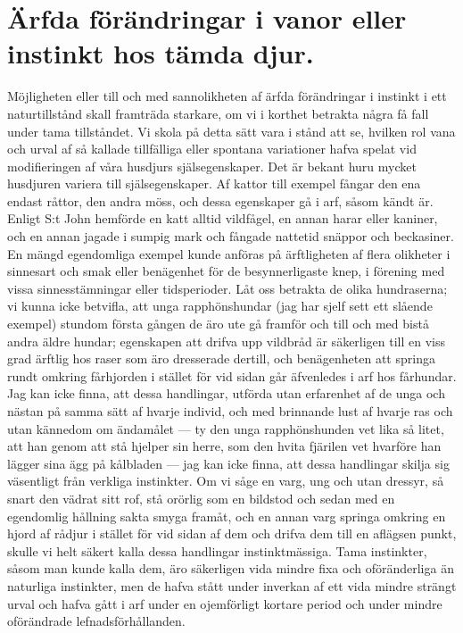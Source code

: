 \section[Ärfda förändringar]{Ärfda förändringar i vanor eller instinkt hos tämda djur.}

Möjligheten eller till och med sannolikheten af ärfda förändringar i instinkt i ett naturtillstånd skall framträda starkare, om vi i korthet betrakta några få fall under tama tillståndet. Vi skola på detta sätt vara i stånd att se, hvilken rol vana och urval af så kallade tillfälliga eller spontana variationer hafva spelat vid modifieringen af våra husdjurs själsegenskaper. Det är bekant huru mycket husdjuren variera till själsegenskaper. Af kattor till exempel fångar den ena endast råttor, den andra möss, och dessa egenskaper gå i arf, såsom kändt är. Enligt S:t John hemförde en katt alltid vildfågel, en annan harar eller kaniner, och en annan jagade i sumpig mark och fångade nattetid snäppor och beckasiner. En mängd egendomliga exempel kunde anföras på ärftligheten af flera olikheter i sinnesart och smak eller benägenhet för de besynnerligaste knep, i förening med vissa sinnesstämningar eller tidsperioder. Låt oss betrakta de olika hundraserna; vi kunna icke betvifla, att unga rapphönshundar (jag har sjelf sett ett slående exempel) stundom första gången de äro ute gå framför och till och med bistå andra äldre hundar; egenskapen att drifva upp vildbråd är säkerligen till en viss grad ärftlig hos raser som äro dresserade dertill, och benägenheten att springa rundt omkring fårhjorden i stället för vid sidan går äfvenledes i arf hos fårhundar. Jag kan icke finna, att dessa handlingar, utförda utan erfarenhet af de unga och nästan på samma sätt af hvarje individ, och med brinnande lust af hvarje ras och utan kännedom om ändamålet — ty den unga rapphönshunden vet lika så litet, att han genom att stå hjelper sin herre, som den hvita fjärilen vet hvarföre han lägger sina ägg på kålbladen — jag kan icke finna, att dessa handlingar skilja sig väsentligt från verkliga instinkter. Om vi såge en varg, ung och utan dressyr, så snart den vädrat sitt rof, stå orörlig som en bildstod och sedan med en egendomlig hållning sakta smyga framåt, och en annan varg springa omkring en hjord af rådjur i stället för vid sidan af dem och drifva dem till en aflägsen punkt, skulle vi helt säkert kalla dessa handlingar instinktmässiga. Tama instinkter, såsom man kunde kalla dem, äro säkerligen vida mindre fixa och oföränderliga än naturliga instinkter, men de hafva stått under inverkan af ett vida mindre strängt urval och hafva gått i arf under en ojemförligt kortare period och under mindre oförändrade lefnadsförhållanden.

